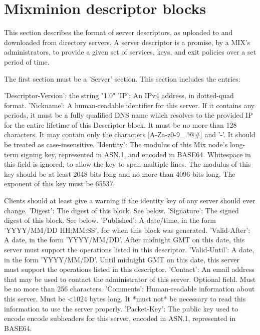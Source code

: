 \section{Mixminion descriptor blocks}

This section describes the format of server descriptors, as uploaded
to and downloaded from directory servers.  A server descriptor is a
promise, by a MIX's administrators, to provide a given set of
services, keys, and exit policies over a set period of time.

The first section must be a 'Server' section.  This section includes
the entries:

     'Descriptor-Version':  the string "1.0"
     'IP': An IPv4 address, in dotted-quad format.
     'Nickname': A human-readable identifier for this server.  If it
         contains any periods, it must be a fully qualified DNS name
         which resolves to the provided IP for the entire lifetime of
         this Descriptor block.  It must be no more than 128
         characters.  It may contain only the characters 
         [A-Za-z0-9_.!@#] and '-'.  It should be treated as
         case-insensitive.
     'Identity': The modulus of this Mix node's long-term signing key,
         represented in ASN.1, and encoded in BASE64.  Whitespace in
         this field is ignored, to allow the key to span multiple
         lines.  The modulus of this key should be at least 2048 bits
         long and no more than 4096 bits long.  The exponent of this 
         key must be 65537.

	 Clients should at least give a warning if the identity key of
         any server should ever change.
     'Digest': The digest of this block. See below.
     'Signature': The signed digest of this block.  See below.
     'Published': A date/time, in the form 'YYYY/MM/DD HH:MM:SS',
         for when this block was generated.
     'Valid-After': A date, in the form 'YYYY/MM/DD'.  After midnight GMT
         on this date, this server must support the operations listed
         in this descriptor.
     'Valid-Until': A date, in the form 'YYYY/MM/DD'.  Until midnight
         GMT on this date, this server must support the operations listed
         in this descriptor.
     'Contact': An email address that may be used to contact the
         administrator of this server. Optional field.  Must be no
         more than 256 characters.
     'Comments': Human-readable information about this server.  Must
         be <1024 bytes long.  It *must not* be necessary to read this
         information to use the server properly.
     'Packet-Key': The public key used to encode encode subheaders for
         this server, encoded in ASN.1, represented in BASE64. 

